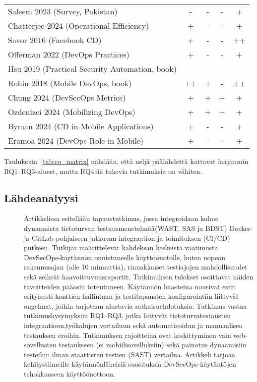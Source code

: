 \documentclass[bscthesis,finnish,oneside,biblatex]{uefcsthesis}
\begin{document}
\begin{table}[htbp]
\begin{tabular}{p{8cm}cccc}
    Saleem 2023 (Survey, Pakistan)                   &  -   &  -  &  -  &  +  \\
    Chatterjee 2024 (Operational Efficiency)         &  +   &  -  &  -  &  +  \\
    Savor 2016 (Facebook CD)                         &  +   &  -  &  -  &  ++ \\
    Offerman 2022 (DevOps Practices)                 &  +   &  -  &  -  &  +  \\
    Hsu 2019 (Practical Security Automation, book)   &      &     &     &     \\
    Rohin 2018 (Mobile DevOps, book)                 &  ++  &  +  &  -  &  ++ \\
    Chung 2024 (DevSecOps Metrics)                   &  +   &  +  &  +  &  +  \\
    Ozdenizci 2024 (Mobilizing DevOps)               &  +   &  +  &  +  &  +  \\
    Byman 2024 (CD in Mobile Applications)           &  +   &  -  &  -  &  +  \\
    Eramoa 2024 (DevOps Role in Mobile)              &  +   &  -  &  -  &  +  \\
    \bottomrule
  \end{tabular}
\end{table}


Taulukosta~\ref{tab:rq_matrix} nähdään, että neljä päälähdettä
kattavat laajimmin RQ1–RQ3-alueet, mutta RQ4:ää tukevia tutkimuksia on
vähiten.

\subsection{Lähdeanalyysi}
\begin{description}
    \item[\cite{rangnau2020_cst}] Artikkelissa esitellään tapaustutkimus, jossa integroidaan kolme dynaamista tietoturvan testausmenetelmää(WAST, SAS ja BDST) Docker- ja GitLab-pohjaiseen jatkuvan integraation ja toimituksen (CI/CD) putkeen. Tutkijat määrittelevät kahdeksan keskeistä vaatimusta DevSecOps-käytännön onnistuneelle käyttöönotolle, kuten nopean rakennusajan (alle 10 minuuttia), rinnakkaiset testiajojen mahdollisuudet sekä selkeät haavoittuvuusraportit. Tutkimuksen tulokset osoittavat näiden tavoitteiden pääosin toteutuneen. Käytännön haasteina nousivat esiin erityisesti konttien hallintaan ja testitapausten konfigurointiin liittyvät ongelmat, joihin tarjotaan alustavia ratkaisuehdotuksia. Tutkimus vastaa tutkimuskysymyksiin RQ1–RQ3, jotka liittyvät tietoturvatestausten integraatioon,työkalujen vertailuun sekä automatisoidun ja manuaalisen testauksen eroihin. Tutkimuksen rajoitteina ovat keskittyminen vain web-sovellusten testaukseen (ei mobiilisovelluksiin) sekä painotus dynaamisiin testeihin ilman staattisten testien (SAST) vertailua. Artikkeli tarjoaa kehitystiimeille käytännönläheisiä suosituksia DevSecOps-käytäntöjen tehokkaaseen käyttöönottoon.
\end{description}
\end{document}
